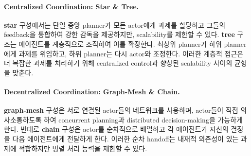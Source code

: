 \paragraph{Centralized Coordination: Star \& Tree.}
\textbf{star} 구성에서는 단일 중앙 planner가 모든 actor에게 과제를 할당하고 그들의 feedback을 통합하여 강한 감독을 제공하지만, scalability를 제한할 수 있다. \textbf{tree} 구조는 에이전트를 계층적으로 조직하여 이를 확장한다. 최상위 planner가 하위 planner에게 과제를 위임하고, 하위 planner는 다시 actor와 조정한다. 이러한 계층적 접근은 더 복잡한 과제를 처리하기 위해 centralized control과 향상된 scalability 사이의 균형을 맞춘다.

\paragraph{Decentralized Coordination: Graph-Mesh \& Chain.}
\textbf{graph-mesh} 구성은 서로 연결된 actor들의 네트워크를 사용하며, actor들이 직접 의사소통하도록 하여 concurrent planning과 distributed decision-making을 가능하게 한다. 반대로 \textbf{chain} 구성은 actor를 순차적으로 배열하고 각 에이전트가 자신의 결정을 다음 에이전트에게 전달하게 한다. 이러한 순차 handoff는 내재적 의존성이 있는 과제에 적합하지만 병렬 처리 능력을 제한할 수 있다.


